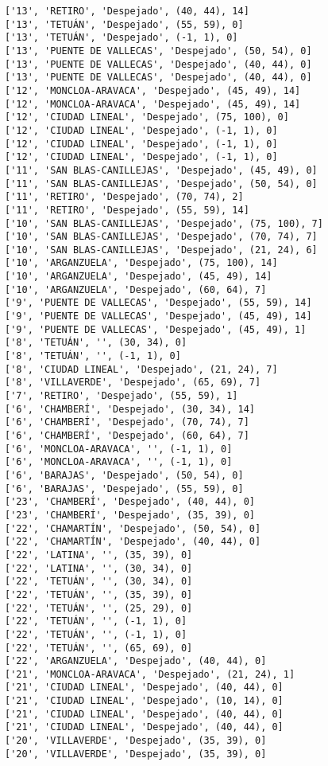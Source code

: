 \documentclass[11pt]{article}
\begin{document}
\begin{Verbatim}[commandchars=\\\{\}]
['13', 'RETIRO', 'Despejado', (40, 44), 14]
['13', 'TETUÁN', 'Despejado', (55, 59), 0]
['13', 'TETUÁN', 'Despejado', (-1, 1), 0]
['13', 'PUENTE DE VALLECAS', 'Despejado', (50, 54), 0]
['13', 'PUENTE DE VALLECAS', 'Despejado', (40, 44), 0]
['13', 'PUENTE DE VALLECAS', 'Despejado', (40, 44), 0]
['12', 'MONCLOA-ARAVACA', 'Despejado', (45, 49), 14]
['12', 'MONCLOA-ARAVACA', 'Despejado', (45, 49), 14]
['12', 'CIUDAD LINEAL', 'Despejado', (75, 100), 0]
['12', 'CIUDAD LINEAL', 'Despejado', (-1, 1), 0]
['12', 'CIUDAD LINEAL', 'Despejado', (-1, 1), 0]
['12', 'CIUDAD LINEAL', 'Despejado', (-1, 1), 0]
['11', 'SAN BLAS-CANILLEJAS', 'Despejado', (45, 49), 0]
['11', 'SAN BLAS-CANILLEJAS', 'Despejado', (50, 54), 0]
['11', 'RETIRO', 'Despejado', (70, 74), 2]
['11', 'RETIRO', 'Despejado', (55, 59), 14]
['10', 'SAN BLAS-CANILLEJAS', 'Despejado', (75, 100), 7]
['10', 'SAN BLAS-CANILLEJAS', 'Despejado', (70, 74), 7]
['10', 'SAN BLAS-CANILLEJAS', 'Despejado', (21, 24), 6]
['10', 'ARGANZUELA', 'Despejado', (75, 100), 14]
['10', 'ARGANZUELA', 'Despejado', (45, 49), 14]
['10', 'ARGANZUELA', 'Despejado', (60, 64), 7]
['9', 'PUENTE DE VALLECAS', 'Despejado', (55, 59), 14]
['9', 'PUENTE DE VALLECAS', 'Despejado', (45, 49), 14]
['9', 'PUENTE DE VALLECAS', 'Despejado', (45, 49), 1]
['8', 'TETUÁN', '', (30, 34), 0]
['8', 'TETUÁN', '', (-1, 1), 0]
['8', 'CIUDAD LINEAL', 'Despejado', (21, 24), 7]
['8', 'VILLAVERDE', 'Despejado', (65, 69), 7]
['7', 'RETIRO', 'Despejado', (55, 59), 1]
['6', 'CHAMBERÍ', 'Despejado', (30, 34), 14]
['6', 'CHAMBERÍ', 'Despejado', (70, 74), 7]
['6', 'CHAMBERÍ', 'Despejado', (60, 64), 7]
['6', 'MONCLOA-ARAVACA', '', (-1, 1), 0]
['6', 'MONCLOA-ARAVACA', '', (-1, 1), 0]
['6', 'BARAJAS', 'Despejado', (50, 54), 0]
['6', 'BARAJAS', 'Despejado', (55, 59), 0]
['23', 'CHAMBERÍ', 'Despejado', (40, 44), 0]
['23', 'CHAMBERÍ', 'Despejado', (35, 39), 0]
['22', 'CHAMARTÍN', 'Despejado', (50, 54), 0]
['22', 'CHAMARTÍN', 'Despejado', (40, 44), 0]
['22', 'LATINA', '', (35, 39), 0]
['22', 'LATINA', '', (30, 34), 0]
['22', 'TETUÁN', '', (30, 34), 0]
['22', 'TETUÁN', '', (35, 39), 0]
['22', 'TETUÁN', '', (25, 29), 0]
['22', 'TETUÁN', '', (-1, 1), 0]
['22', 'TETUÁN', '', (-1, 1), 0]
['22', 'TETUÁN', '', (65, 69), 0]
['22', 'ARGANZUELA', 'Despejado', (40, 44), 0]
['21', 'MONCLOA-ARAVACA', 'Despejado', (21, 24), 1]
['21', 'CIUDAD LINEAL', 'Despejado', (40, 44), 0]
['21', 'CIUDAD LINEAL', 'Despejado', (10, 14), 0]
['21', 'CIUDAD LINEAL', 'Despejado', (40, 44), 0]
['21', 'CIUDAD LINEAL', 'Despejado', (40, 44), 0]
['20', 'VILLAVERDE', 'Despejado', (35, 39), 0]
['20', 'VILLAVERDE', 'Despejado', (35, 39), 0]

\end{Verbatim}
\end{document}
